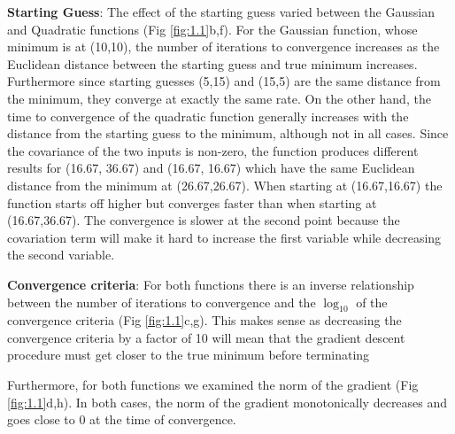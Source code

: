 \documentclass[10pt]{article}
\begin{document}
  \textbf{Starting Guess}: The effect of the starting guess varied between the Gaussian and Quadratic functions (Fig \ref{fig:1.1}b,f). For the Gaussian function, whose minimum is at (10,10), the number of iterations to convergence increases as the Euclidean distance between the starting guess and true minimum increases. Furthermore since starting guesses (5,15) and (15,5) are the same distance from the minimum, they converge at exactly the same rate. On the other hand, the time to convergence of the quadratic function generally increases with the distance from the starting guess to the minimum, although not in all cases. Since the covariance of the two inputs is non-zero, the function produces different results for (16.67, 36.67) and (16.67, 16.67) which have the same Euclidean distance from the minimum at (26.67,26.67). When starting at (16.67,16.67) the function starts off higher but converges faster than when starting at (16.67,36.67). The convergence is slower at the second point because the covariation term will make it hard to increase the first variable while decreasing the second variable. 
  
\textbf{Convergence criteria}: For both functions there is an inverse relationship between the number of iterations to convergence and the $\log_{10}$ of the convergence criteria (Fig \ref{fig:1.1}c,g). This makes sense as decreasing the convergence criteria by a factor of 10 will mean that the gradient descent procedure must get closer to the true minimum before terminating

\medskip
Furthermore, for both functions we examined the norm of the gradient (Fig \ref{fig:1.1}d,h). In both cases, the norm of the gradient monotonically decreases and goes close to 0 at the time of convergence.
\end{document}
